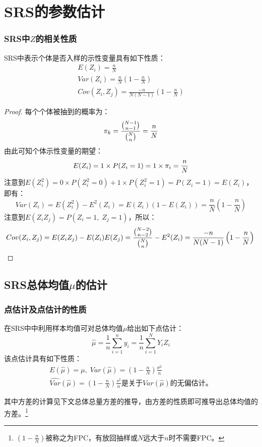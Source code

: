 \section{SRS的参数估计}

\subsubsection{SRS中$Z$的相关性质} 
\begin{theorem}
	SRS中表示个体是否入样的示性变量具有如下性质：
	\begin{gather*}
		E(Z_i)=\frac{n}{N} \\
		Var(Z_i)=\frac{n}{N}\left(1-\frac{n}{N}\right) \\
		Cov(Z_i,Z_j)=\frac{-n}{N(N-1)}\left(1-\frac{n}{N}\right) 
	\end{gather*}
\end{theorem}
\begin{proof}
	每个个体被抽到的概率为：
	\begin{equation}
		\pi_k=\frac{\binom{N-1}{n-1}}{\binom{N}{n}}=\frac{n}{N}\notag
	\end{equation}      
	由此可知个体示性变量的期望：
	\begin{equation}
		E(Z_i)=1\times P(Z_i=1)=1\times \pi_i=\frac{n}{N}\notag
	\end{equation}
	注意到$E(Z_i^2)=0\times P(Z_i^2=0)+1\times P(Z_i^2=1)=P(Z_i=1)=E(Z_i)$，即有：
	\begin{equation*}
		Var(Z_i)=E(Z_i^2)-E^2(Z_i)
		=E(Z_i)\left(1-E(Z_i)\right)
		=\frac{n}{N}\left(1-\frac{n}{N}\right)
	\end{equation*}
	注意到$E(Z_iZ_j)=P(Z_i=1,\;Z_j=1)$，所以：
	\begin{equation*}
		Cov(Z_i,Z_j)=E(Z_iZ_j)-E(Z_i)E(Z_j)
		=\frac{\binom{N-2}{n-2}}{\binom{N}{n}}-E^2(Z_i)
		=\frac{-n}{N(N-1)}\left(1-\frac{n}{N}\right) \qedhere
	\end{equation*}
\end{proof}

\subsection{SRS总体均值$\mu$的估计} 
\subsubsection{点估计及点估计的性质}
\begin{theorem}
	在SRS中中利用样本均值可对总体均值$\mu$给出如下点估计：
	\begin{equation*}
		\hat{\mu}=\frac{1}{n}\sum\limits_{i=1}^{n}y_i=\frac{1}{n}\sum\limits_{i=1}^{N}Y_iZ_i
	\end{equation*}
	该点估计具有如下性质：
	\begin{gather*}
		E(\hat{\mu})=\mu,\;Var(\hat{\mu})=\left(1-\frac{n}{N}\right)\frac{\sigma^2}{n} \\
		\widehat{Var}(\hat{\mu})=\left(1-\frac{n}{N}\right)\frac{s^2}{n}\text{是关于}Var(\hat{\mu})\text{的无偏估计。}
	\end{gather*}
\end{theorem}
其中方差的计算见下文总体总量方差的推导，由方差的性质即可推导出总体均值的方差。\footnote{$\left(1-\frac{n}{N}\right)$被称之为\gls{FPC}，有放回抽样或$N$远大于$n$时不需要FPC。}
